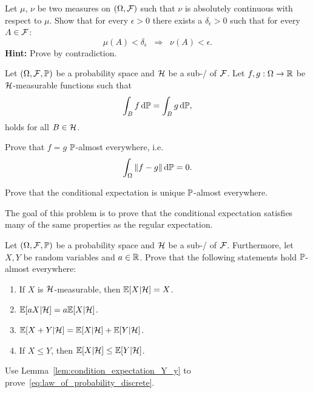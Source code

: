 \begin{problem}
	Let $\mu$, $\nu$ be two measures on $(\Omega, \mathcal F)$ such that $\nu$ is absolutely continuous with respect to $\mu$. Show that for every $\epsilon > 0$ there exists a $\delta_\epsilon > 0$ such that for every $A \in \mathcal F$:
	\[
		\mu(A) < \delta_\epsilon\;\;\Longrightarrow\;\; \nu(A) < \epsilon.
	\]
	\textbf{Hint:} Prove by contradiction.
\end{problem}


\begin{problem}
Let $(\Omega, \mathcal F, \mathbb P)$ be a probability space and $\mathcal H$ be a sub-\sigalg/ of $\mathcal F$. Let $f, g : \Omega \to \mathbb R$ be $\mathcal H$-measurable functions such that
\[
	\int_B f \, \mathrm{d} \mathbb P = \int_B g \, \mathrm{d} \mathbb P,
\]
holds for all $B \in \mathcal H$. 

Prove that $f=g$ $\mathbb P$-almost everywhere, i.e.
\[
	\int_\Omega \|f - g\| \, \mathrm{d} \mathbb P = 0.
\]
\end{problem}

\begin{problem}
Prove that the conditional expectation is unique $\mathbb P$-almost everywhere.
\end{problem}

\begin{problem}
The goal of this problem is to prove that the conditional expectation satisfies many of the same properties as the regular expectation. 

Let $(\Omega, \mathcal F, \mathbb P)$ be a probability space and $\mathcal H$ be a sub-\sigalg/ of $\mathcal F$. Furthermore, let $X, Y$ be random variables and $a \in \mathbb R$. Prove that the following statements hold $\mathbb P$-almost everywhere:
\begin{enumerate}[label={(\alph*)}]
\item If $X$ is $\mathcal H$-measurable, then $\mathbb E[X | \mathcal H] = X$.
\item $\mathbb E[a X | \mathcal H] = a \mathbb E[X | \mathcal H]$.
\item $\mathbb E[X + Y | \mathcal H] = \mathbb E[X | \mathcal H] + \mathbb E[Y | \mathcal H]$.
\item If $X \le Y$, then $\mathbb E[X | \mathcal H] \le \mathbb E[Y | \mathcal H]$.
\end{enumerate}
\end{problem}

\begin{problem}\label{prb:law_of_probability_discrete}
Use Lemma~\ref{lem:condition_expectation_Y_y} to prove~\eqref{eq:law_of_probability_discrete}.
\end{problem}
